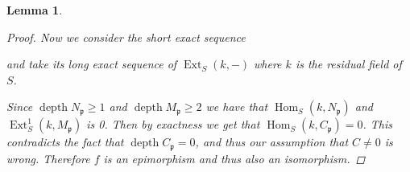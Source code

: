 \documentclass[11pt, a4paper, english]{article}
\newtheorem{lemma}[theorem]{Lemma}
\theoremstyle{definition}
\DeclareMathOperator{\Hom}{Hom}
\DeclareMathOperator{\Ext}{Ext}
\DeclareMathOperator{\depth}{depth}
\begin{document}
\begin{lemma}
\begin{proof}
Now we consider the short exact sequence
\begin{center}
\end{center}
and take its long exact sequence of $\Ext_S(k, -)$ where $k$ is the residual field of $S$.
\begin{center}
\end{center}
Since $\depth N_\mathfrak{p} \geq 1$ and $\depth M_\mathfrak{p} \geq 2$ we have that $\Hom_S(k, N_\mathfrak{p})$ and $\Ext^1_S(k, M_\mathfrak{p})$ is 0. Then by exactness we get that $\Hom_S(k, C_\mathfrak{p}) = 0$. This contradicts the fact that $\depth C_\mathfrak{p} = 0$, and thus our assumption that $C \neq 0$ is wrong. Therefore $f$ is an epimorphism and thus also an isomorphism.
\end{proof}
\end{lemma}
\end{document}

